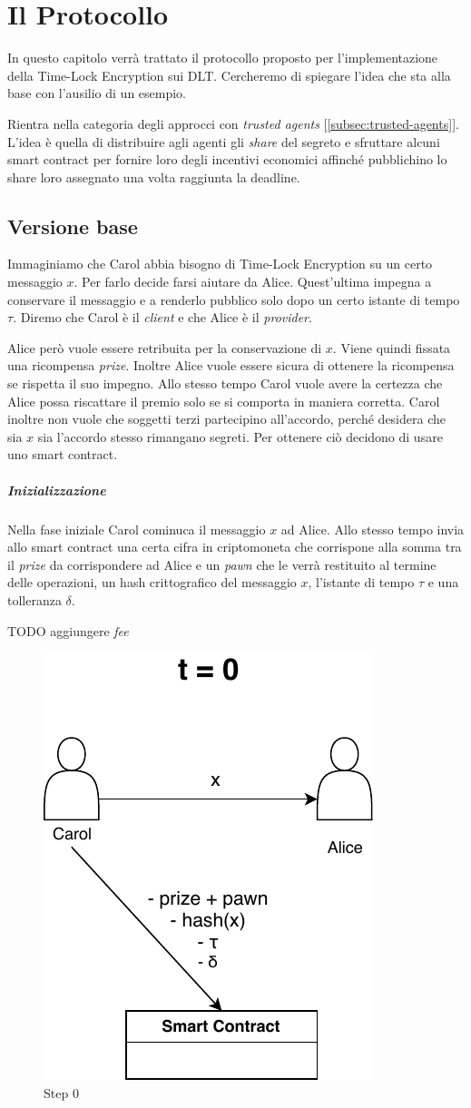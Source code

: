 \chapter{Il Protocollo}
\label{chap:protocollo}

In questo capitolo verrà trattato il protocollo proposto per l'implementazione
della Time-Lock Encryption sui DLT.
Cercheremo di spiegare
l'idea che sta alla base con l'ausilio di un esempio.

Rientra nella categoria degli approcci
con \textit{trusted agents} [\ref{subsec:trusted-agents}].
L'idea è quella di distribuire agli agenti gli \textit{share} del segreto
e sfruttare alcuni smart contract per
fornire loro degli incentivi economici affinché pubblichino lo share 
loro assegnato una volta raggiunta la deadline.
\section{Versione base}
\label{sec:versione-base}
Immaginiamo che Carol abbia bisogno di Time-Lock Encryption su un certo messaggio $ x $.
Per farlo decide farsi aiutare da Alice. Quest'ultima
impegna a conservare il messaggio e a renderlo pubblico solo dopo un
certo istante di tempo $ \tau $.
Diremo che Carol è il \textit{client} e che Alice è il \textit{provider}.

Alice però vuole essere retribuita per la conservazione di $ x $. Viene quindi fissata
una ricompensa \textit{prize}. Inoltre Alice vuole essere sicura di
ottenere la ricompensa se rispetta il suo impegno. Allo stesso tempo Carol
vuole avere la certezza che Alice possa riscattare il premio solo se si comporta
in maniera corretta.
Carol inoltre non vuole che soggetti terzi partecipino all'accordo, perché desidera
che sia $ x $ sia l'accordo stesso rimangano segreti.
Per ottenere ciò decidono di usare uno smart contract.

\paragraph{Inizializzazione}
Nella fase iniziale Carol cominuca il messaggio $ x $ ad Alice. Allo stesso tempo invia
allo smart contract una certa cifra in criptomoneta
che corrispone alla somma tra il \textit{prize} da corrispondere ad Alice e un
\textit{pawn} che le verrà restituito al termine delle operazioni, un hash
crittografico del messaggio $ x $, l'istante di tempo $ \tau $ e una tolleranza $ \delta $.

TODO aggiungere \textit{fee}
\begin{figure}[H]
	\centering
	\includegraphics[width=0.3\linewidth]{images/chap_protocollo/base-creazione.pdf}
	\caption{Step 0}
\end{figure}


